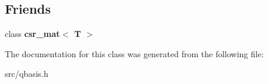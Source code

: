 \subsection*{Friends}
\begin{DoxyCompactItemize}
\item 
\mbox{\label{classqbasis_1_1lil__mat_a49045f9373d901d71be24c338544a88a}} 
class {\bfseries csr\+\_\+mat$<$ T $>$}
\end{DoxyCompactItemize}


The documentation for this class was generated from the following file\+:\begin{DoxyCompactItemize}
\item 
src/qbasis.\+h\end{DoxyCompactItemize}
